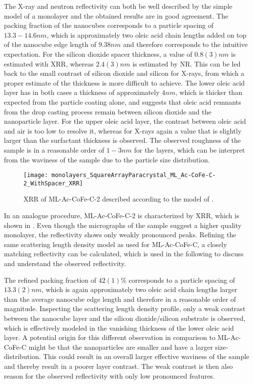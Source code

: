 \documentclass[\main/dresen_thesis.tex]{subfiles}
\begin{document}
  The X-ray and neutron reflectivity can both be well described by the simple model of a monolayer and the obtained results are in good agreement.
  The packing fraction of the nanocubes corresponds to a particle spacing of $13.3 - 14.6 \unit{nm}$, which is approximately two oleic acid chain lengths added on top of the nanocube edge length of $9.38 \unit{nm}$ and therefore corresponds to the intuitive expectation.
  For the silicon dioxide spacer thickness, a value of $0.8(3) \unit{nm}$ is estimated with  XRR, whereas $2.4(3) \unit{nm}$ is estimated by NR.
  This can be led back to the small contrast of silicon dioxide and silicon for X-rays, from which a proper estimate of the thickness is more difficult to achieve.
  The lower oleic acid layer has in both cases a thickness of approximately $4 \unit{nm}$, which is thicker than expected from the particle coating alone, and suggests that oleic acid remnants from the drop casting process remain between silicon dioxide and the nanoparticle layer.
  For the upper oleic acid layer, the contrast between oleic acid and air is too low to resolve it, whereas for X-rays again a value that is slightly larger than the surfactant thickness is observed.
  The observed roughness of the sample is in a reasonable order of $1 - 3 \unit{nm}$ for the layers, which can be interpret from the waviness of the sample \eg due to the particle size distribution.

  \begin{figure}[tb]
    \centering
    \texttt{[image: monolayers\_SquareArrayParacrystal\_ML\_Ac-CoFe-C-2\_WithSpacer\_XRR]}
    \caption{\label{fig:monolayers:structure:squareArrayParacrystal:XRR}XRR of ML-Ac-CoFe-C-2 described according to the model of .}
  \end{figure}

  In an analogue procedure, ML-Ac-CoFe-C-2 is characterized by XRR, which is shown in .
  Even though the micrographs of the sample suggest a higher quality monolayer, the reflectivity shows only weakly pronounced peaks.
  Refining the same scattering length density model as used for ML-Ac-CoFe-C, a closely matching reflectivity can be calculated, which is used in the following to discuss and understand the observed reflectivity.

  The refined packing fraction of $42(1) \%$ corresponds to a particle spacing of $13.3(2) \unit{nm}$, which is again approximately two oleic acid chain lengths larger than the average nanocube edge length and therefore in a reasonable order of magnitude.
  Inspecting the scattering length density profile, only a weak contrast between the nanocube layer and the silicon dioxide/silicon substrate is observed, which is effectively modeled in the vanishing thickness of the lower oleic acid layer.
  A potential origin for this different observation in comparison to ML-Ac-CoFe-C might be that the nanoparticles are smaller and have a larger size-distribution.
  This could result in an overall larger effective waviness of the sample and thereby result in a poorer layer contrast.
  The weak contrast is then also reason for the observed reflectivity with only low pronounced features.
  
\end{document}
